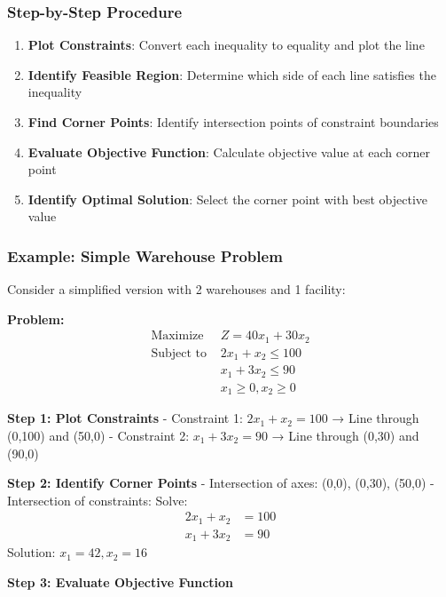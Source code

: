 \documentclass[
  letterpaper,
  DIV=11,
  numbers=noendperiod]{scrreprt}
\providecommand{\tightlist}{%
  \setlength{\itemsep}{0pt}\setlength{\parskip}{0pt}}
\begin{document}
\subsubsection{Step-by-Step Procedure}\label{step-by-step-procedure}

\begin{enumerate}
\def\labelenumi{\arabic{enumi}.}
\tightlist
\item
  \textbf{Plot Constraints}: Convert each inequality to equality and
  plot the line
\item
  \textbf{Identify Feasible Region}: Determine which side of each line
  satisfies the inequality
\item
  \textbf{Find Corner Points}: Identify intersection points of
  constraint boundaries
\item
  \textbf{Evaluate Objective Function}: Calculate objective value at
  each corner point
\item
  \textbf{Identify Optimal Solution}: Select the corner point with best
  objective value
\end{enumerate}

\subsubsection{Example: Simple Warehouse
Problem}\label{example-simple-warehouse-problem}

Consider a simplified version with 2 warehouses and 1 facility:

\textbf{Problem:} \[
\begin{aligned}
\text{Maximize } & Z = 40x_1 + 30x_2 \\
\text{Subject to } & 2x_1 + x_2 \leq 100 \\
& x_1 + 3x_2 \leq 90 \\
& x_1 \geq 0, x_2 \geq 0
\end{aligned}
\]

\textbf{Step 1: Plot Constraints} - Constraint 1: \(2x_1 + x_2 = 100\) →
Line through (0,100) and (50,0) - Constraint 2: \(x_1 + 3x_2 = 90\) →
Line through (0,30) and (90,0)

\textbf{Step 2: Identify Corner Points} - Intersection of axes: (0,0),
(0,30), (50,0) - Intersection of constraints: Solve: \[
  \begin{aligned}
  2x_1 + x_2 &= 100 \\
  x_1 + 3x_2 &= 90
  \end{aligned}
 \] Solution: \(x_1 = 42, x_2 = 16\)

\textbf{Step 3: Evaluate Objective Function}
\end{document}
